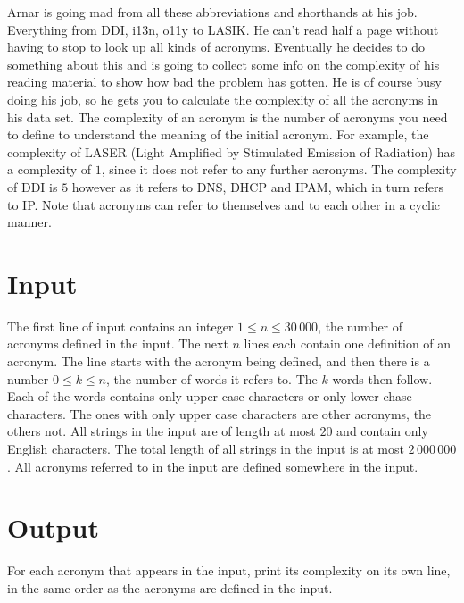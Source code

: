 
Arnar is going mad from all these abbreviations and shorthands at his job. Everything from DDI, i13n, o11y to LASIK. He can't read
half a page without having to stop to look up all kinds of acronyms. Eventually he decides to do something about this and is going
to collect some info on the complexity of his reading material to show how bad the problem has gotten. He is of course busy doing his
job, so he gets you to calculate the complexity of all the acronyms in his data set. The complexity of an acronym is the number of acronyms
you need to define to understand the meaning of the initial acronym. For example, the complexity of LASER (Light Amplified by Stimulated
Emission of Radiation) has a complexity of $1$, since it does not refer to any further acronyms. The complexity of DDI is $5$ however as it
refers to DNS, DHCP and IPAM, which in turn refers to IP.
Note that acronyms can refer to themselves and to each other in a cyclic manner.

\section*{Input}
The first line of input contains an integer $1 \leq n \leq 30 \, 000$, the number of acronyms defined in the input.
The next $n$ lines each contain one definition of an acronym. The line starts with the acronym being defined, and then there is a
number $0 \leq k \leq n$, the number of words it refers to. The $k$ words then follow. Each of the words contains only upper case characters
or only lower chase characters. The ones with only upper case characters are other acronyms, the others not. 
All strings in the input are of length at most $20$ and contain only English characters. The total length of all strings in
the input is at most $2 \, 000 \, 000$. All acronyms referred to in the input are defined somewhere in the input.

\section*{Output}
For each acronym that appears in the input, print its complexity on its own line, in the same order as the acronyms are defined in
the input.

